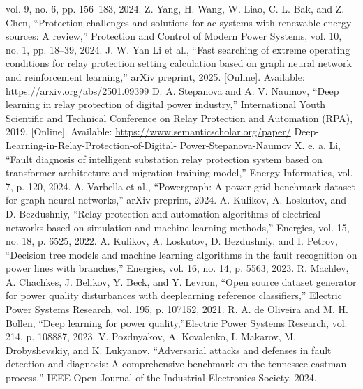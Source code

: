 vol. 9, no. 6, pp. 156–183, 2024.
Z. Yang, H. Wang, W. Liao, C. L. Bak, and Z. Chen, “Protection challenges and solutions
for ac systems with renewable energy sources: A review,” Protection and Control of Modern
Power Systems, vol. 10, no. 1, pp. 18–39, 2024.
J. W. Yan Li et al., “Fast searching of extreme operating conditions for relay protection
setting calculation based on graph neural network and reinforcement learning,” arXiv
preprint, 2025. [Online]. Available: \url{https://arxiv.org/abs/2501.09399}
D. A. Stepanova and A. V. Naumov, “Deep learning in relay protection of digital power
industry,” International Youth Scientific and Technical Conference on Relay Protection and
Automation (RPA), 2019. [Online]. Available: \url{https://www.semanticscholar.org/paper/}
Deep-Learning-in-Relay-Protection-of-Digital- Power-Stepanova-Naumov
X. e. a. Li, “Fault diagnosis of intelligent substation relay protection system based on
transformer architecture and migration training model,” Energy Informatics, vol. 7, p.
120, 2024.
A. Varbella et al., “Powergraph: A power grid benchmark dataset for graph neural
networks,” arXiv preprint, 2024.
A. Kulikov, A. Loskutov, and D. Bezdushniy, “Relay protection and automation algorithms of
electrical networks based on simulation and machine learning methods,” Energies, vol. 15,
no. 18, p. 6525, 2022.
A. Kulikov, A. Loskutov, D. Bezdushniy, and I. Petrov, “Decision tree models and machine
learning algorithms in the fault recognition on power lines with branches,” Energies, vol.
16, no. 14, p. 5563, 2023.
R. Machlev, A. Chachkes, J. Belikov, Y. Beck, and Y. Levron, “Open source dataset
generator for power quality disturbances with deeplearning reference classifiers,”
Electric Power Systems Research, vol. 195, p. 107152, 2021.
R. A. de Oliveira and M. H. Bollen, “Deep learning for power quality,”Electric Power
Systems Research, vol. 214, p. 108887, 2023.
V. Pozdnyakov, A. Kovalenko, I. Makarov, M. Drobyshevskiy, and K. Lukyanov, “Adversarial
attacks and defenses in fault detection and diagnosis: A comprehensive benchmark on the
tennessee eastman process,” IEEE Open Journal of the Industrial Electronics Society, 2024.
